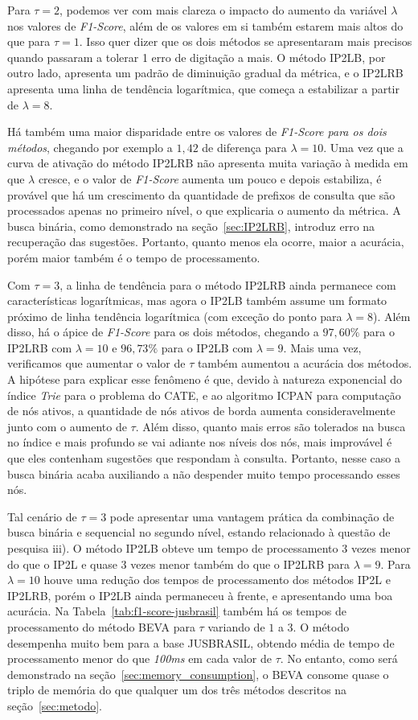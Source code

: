 Para $\tau=2$, podemos ver com mais clareza o impacto do aumento da variável $\lambda$ nos valores de \textit{F1-Score}, além de os valores em si também estarem mais altos do que para $\tau=1$. Isso quer dizer que os dois métodos se apresentaram mais precisos quando passaram a tolerar 1 erro de digitação a mais. O método IP2LB, por outro lado, apresenta um padrão de diminuição gradual da métrica, e o IP2LRB apresenta uma linha de tendência logarítmica, que começa a estabilizar a partir de $\lambda=8$.

Há também uma maior disparidade entre os valores de \textit{F1-Score para os dois métodos}, chegando por exemplo a $1,42$ de diferença para $\lambda=10$. Uma vez que a curva de ativação do método IP2LRB não apresenta muita variação à medida em que $\lambda$ cresce, e o valor de \textit{F1-Score} aumenta um pouco e depois estabiliza, é provável que há um crescimento da quantidade de  prefixos de consulta que são processados apenas no primeiro nível, o que explicaria o aumento da métrica. A busca binária, como demonstrado na seção~\ref{sec:IP2LRB}, introduz erro na recuperação das sugestões. Portanto, quanto menos ela ocorre, maior a acurácia, porém maior também é o tempo de processamento.

Com $\tau=3$, a linha de tendência para o método IP2LRB ainda permanece com características logarítmicas, mas agora o IP2LB também assume um formato próximo de linha tendência logarítmica (com exceção do ponto para $\lambda=8$). Além disso, há o ápice de \textit{F1-Score} para os dois métodos, chegando a $97,60\%$ para o IP2LRB com $\lambda=10$ e $96,73\%$ para o IP2LB com $\lambda=9$. Mais uma vez, verificamos que aumentar o valor de $\tau$ também aumentou a acurácia dos métodos. A hipótese para explicar esse fenômeno é que, devido à natureza exponencial do índice \textit{Trie} para o problema do CATE, e ao algoritmo ICPAN para computação de nós ativos, a quantidade de nós ativos de borda aumenta consideravelmente junto com o aumento de $\tau$. Além disso, quanto mais erros são tolerados na busca no índice e mais profundo se vai adiante nos níveis dos nós, mais improvável é que eles contenham sugestões que respondam à consulta. Portanto, nesse caso a busca binária acaba auxiliando a não despender muito tempo processando esses nós.

Tal cenário de $\tau=3$ pode apresentar uma vantagem prática da combinação de busca binária e sequencial no segundo nível, estando relacionado à questão de pesquisa iii). O método IP2LB obteve um tempo de processamento 3 vezes menor do que o IP2L e quase 3 vezes menor também do que o IP2LRB para $\lambda=9$. Para $\lambda=10$ houve uma redução dos tempos de processamento dos métodos IP2L e IP2LRB, porém o IP2LB ainda permaneceu à frente, e apresentando uma boa acurácia. Na Tabela~\ref{tab:f1-score-jusbrasil} também há os tempos de processamento do método BEVA para $\tau$ variando de $1$ a $3$. O método desempenha muito bem para a base JUSBRASIL, obtendo média de tempo de processamento menor do que \textit{100ms} em cada valor de $\tau$. No entanto, como será demonstrado na seção~\ref{sec:memory_consumption}, o BEVA consome quase o triplo de memória do que qualquer um dos três métodos descritos na seção~\ref{sec:metodo}. 

